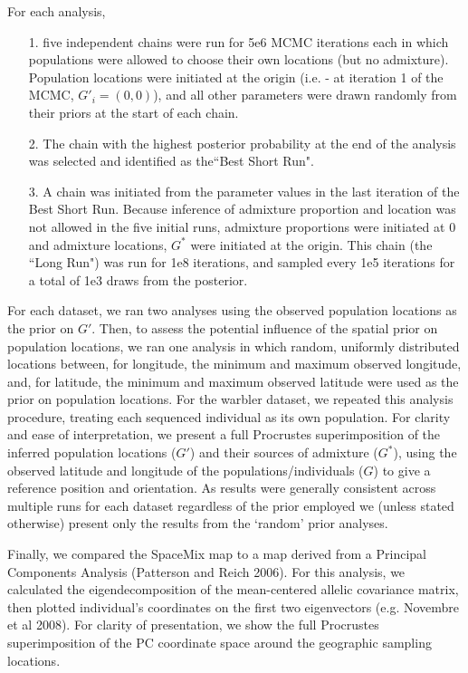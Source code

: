 \documentclass[12pt]{article}
\newcommand{\admixsource}[1]{{$G^{*}$}}
\newcommand{\identifyadmixsource}[1]{{#1^{*}}}
\begin{document}
For each analysis,
\begin{itemize}
\item[1.] five independent chains were run for 5e6 MCMC iterations each in which populations were allowed to choose their own locations (but no admixture).  Population locations were initiated at the origin (i.e. - at iteration 1 of the MCMC, $G'_i = (0,0)$), and all other parameters were drawn randomly from their priors at the start of each chain.  
%
\item[2.]The chain with the highest posterior probability at the end of the analysis was selected and identified as the``Best Short Run".
%
\item[3.] A chain was initiated from the parameter values in the last iteration of the Best Short Run.  Because inference of admixture proportion and location was not allowed in the five initial runs, admixture proportions were initiated at 0 and admixture locations, \admixsource{G} were initiated at the origin.  This  chain (the ``Long Run") was run for 1e8 iterations, and sampled every 1e5 iterations for a total of 1e3 draws from the posterior.
\end{itemize}

For each dataset, we ran two analyses using the observed population locations as the prior on $G'$.  Then, to assess the potential influence of the spatial prior on population locations, we ran one analysis in which random, uniformly distributed locations between, for longitude, the minimum and maximum observed longitude, and, for latitude, the minimum and maximum observed latitude were used as the prior on population locations.  For the warbler dataset, we repeated this analysis procedure, treating each sequenced individual as its own population.  For clarity and ease of interpretation, we present a full Procrustes superimposition of the inferred population locations ($G'$) and their sources of admixture ($\identifyadmixsource{G}$), using the observed latitude and longitude of the populations/individuals ($G$) to give a reference position and orientation.  As results were generally consistent across multiple runs for each dataset regardless of the prior employed we (unless stated otherwise) present only the results from the `random' prior analyses.

Finally, we compared the SpaceMix map to a map derived from a Principal Components Analysis (Patterson and Reich 2006).  For this analysis, we calculated the eigendecomposition of the mean-centered allelic covariance matrix, then plotted individual's coordinates on the first two eigenvectors (e.g. Novembre et al 2008).  For clarity of presentation, we show the full Procrustes superimposition of the PC coordinate space around the geographic sampling locations.
\end{document}
